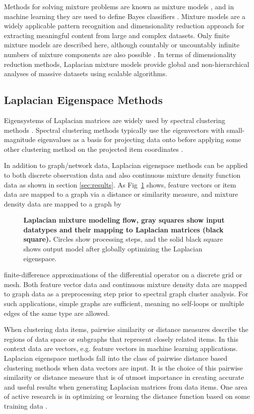 \documentclass[10pt,letterpaper]{article}
\begin{document}
Methods for solving mixture problems are known as mixture models \cite{ev96}, and in machine learning they are used to define Bayes classifiers  \cite{bishop}.
Mixture models are a widely applicable pattern recognition and dimensionality reduction approach for extracting meaningful content from large and complex datasets.
Only finite mixture models are described here, although countably or uncountably infinite numbers of mixture components are also possible \cite{jordan06}.
In terms of dimensionality reduction methods, Laplacian mixture models provide global and non-hierarchical analyses of massive datasets using scalable algorithms.
\subsection{Laplacian Eigenspace Methods}
Eigensystems of Laplacian matrices are widely used by spectral clustering methods \cite{azran}. %
Spectral clustering methods typically use the eigenvectors with small-magnitude eigenvalues as a basis for projecting data onto before applying some other clustering method on the projected item coordinates \cite{njw}.

In addition to graph/network data, Laplacian eigenspace methods can be applied to both discrete observation data and also continuous mixture density function data as shown in section \ref{sec:results}.
As Fig~\ref{fig:0} shows, feature vectors or item data are mapped to a graph via a distance or similarity measure, and mixture density data are mapped to a graph by
\begin{figure}[!h]
\caption{
{\bf Laplacian mixture modeling flow, gray squares show input datatypes and their mapping to Laplacian matrices (black square).}
Circles show processing steps, and the solid black square shows output model after globally optimizing the Laplacian eigenspace.}
\label{fig:0}
\end{figure}
finite-difference approximations of the differential operator on a discrete grid or mesh.
Both feature vector data and continuous mixture density data are mapped to graph data as a preprocessing step prior to spectral graph cluster analysis.
For such applications, simple graphs are sufficient, meaning no self-loops or multiple edges of the same type are allowed.

When clustering data items, pairwise similarity or distance measures describe the regions of data space or subgraphs that represent closely related items.
In this context data are vectors, e.g. feature vectors in machine learning applications.
Laplacian eigenspace methods fall into the class of pairwise distance based clustering methods when data vectors are input.
It is the choice of this pairwise similarity or distance measure that is of utmost importance in creating accurate and useful results when generating Laplacian matrices from data items. One area of active research is in optimizing or learning the distance function based on some  training data \cite{gould14}.
\end{document}
